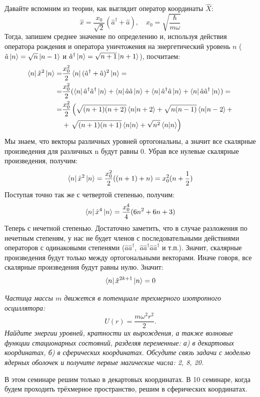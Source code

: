 Давайте вспомним из теории, как выглядит оператор координаты $\hat X$: 
\[
\hat x = \frac{x_0}{\sqrt{2}}(\hat a^{\dagger} + \hat a),\quad x_0 = \sqrt{\frac{\hbar}{m\omega}}
\]
Тогда, запишем среднее значение по определению и, используя действия оператора рождения и оператора уничтожения на энергетический уровень $n$ ($\hat a\ket{n} = \sqrt{n}\ket{n-1}$ и $\hat{a}^{\dagger}\ket{n} = \sqrt{n+1}\ket{n+1}$), посчитаем:
\begin{align*}
    \bra{n}\hat x^2 \ket{n} = &\frac{x^2_0}{2}\bra{n}(\hat a^{\dagger} + \hat a)^2\ket{n} =\\
    = &\frac{x^2_0}{2}(\bra{n}\hat a^{\dagger}\hat a^{\dagger}\ket{n} +\bra{n}\hat a\hat a\ket{n} + \bra{n}\hat a^{\dagger}\hat a\ket{n} + \bra{n}\hat a\hat a^{\dagger}\ket{n}) =\\
    = &\frac{x^2_0}{2}\left(\sqrt{(n+1)(n+2)}\bra{n}\ket{n+2} + \sqrt{n(n-1)}\bra{n}\ket{n-2} + \right.\\ &+ \left. \sqrt{(n+1)(n+1)}\bra{n}\ket{n} + \sqrt{n^2}\bra{n}\ket{n}\right)
\end{align*}
Мы знаем, что векторы различных уровней ортогональны, а значит все скалярные произведения для различных n будут равны 0. Убрав все нулевые скалярные произведения, получим:
\[
\bra{n}\hat x^2\ket{n} = \frac{x^2_0}{2}((n+1) + n) = x^2_0(n + \frac{1}{2})
\]
Поступая точно так же с четвертой степенью, получим:
\[
\bra{n}\hat x^4\ket{n} = \frac{x_0^4}{4}(6n^2 + 6n + 3)
\]
Теперь с нечетной степенью. Достаточно заметить, что в случае разложения по нечетным степеням, у нас не будет членов с последовательными действиями операторов с одинаковыми степенями ($\hat a\hat a^{\dagger},\; \hat a\hat a^{\dagger}\hat a\hat a^{\dagger}$ и т.п.). Значит, скалярные произведения будут только между ортогональными векторами. Иначе говоря, все скалярные произведения будут равны нулю. Значит: 
\[
\bra{n}\hat x^{2k+1}\ket{n} = 0
\]
\begin{center}
    \textit{Частица массы $m$ движется в потенциале трехмерного изотропного осциллятора:}
    \[
    U(r) = \frac{m\omega^2r^2}{2}.
    \]
    \textit{Найдите энергии уровней, кратности их вырождения, а также волновые функции стационарных состояний, разделяя переменные: а) в декартовых координатах, б) в сферических координатах. Обсудите связь задачи с моделью ядерных оболочек и получите первые магические числа: 2, 8, 20.}
\end{center}

В этом семинаре решим только в декартовых координатах. В 10 семинаре, когда будем проходить трёхмерное пространство, решим в сферических координатах.

